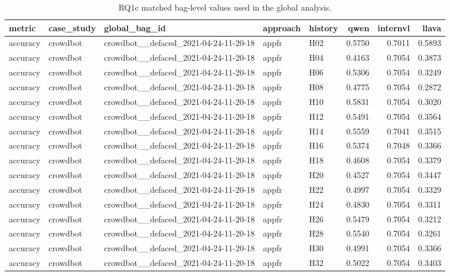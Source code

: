 \begin{table}[tbp]
\caption{RQ1c matched bag-level values used in the global analysis.}
\label{tab:rq1c_global_aligned_values}
\begin{tabular}{lllllrrr}
\toprule
metric & case\_study & global\_bag\_id & approach & history & qwen & internvl & llava \\
\midrule
accuracy & crowdbot & crowdbot\_\_defaced\_2021-04-24-11-20-18 & appfr & H02 & 0.5750 & 0.7011 & 0.5893 \\
accuracy & crowdbot & crowdbot\_\_defaced\_2021-04-24-11-20-18 & appfr & H04 & 0.4163 & 0.7054 & 0.3873 \\
accuracy & crowdbot & crowdbot\_\_defaced\_2021-04-24-11-20-18 & appfr & H06 & 0.5306 & 0.7054 & 0.3249 \\
accuracy & crowdbot & crowdbot\_\_defaced\_2021-04-24-11-20-18 & appfr & H08 & 0.4775 & 0.7054 & 0.2872 \\
accuracy & crowdbot & crowdbot\_\_defaced\_2021-04-24-11-20-18 & appfr & H10 & 0.5831 & 0.7054 & 0.3020 \\
accuracy & crowdbot & crowdbot\_\_defaced\_2021-04-24-11-20-18 & appfr & H12 & 0.5491 & 0.7054 & 0.3564 \\
accuracy & crowdbot & crowdbot\_\_defaced\_2021-04-24-11-20-18 & appfr & H14 & 0.5559 & 0.7041 & 0.3515 \\
accuracy & crowdbot & crowdbot\_\_defaced\_2021-04-24-11-20-18 & appfr & H16 & 0.5374 & 0.7048 & 0.3366 \\
accuracy & crowdbot & crowdbot\_\_defaced\_2021-04-24-11-20-18 & appfr & H18 & 0.4608 & 0.7054 & 0.3379 \\
accuracy & crowdbot & crowdbot\_\_defaced\_2021-04-24-11-20-18 & appfr & H20 & 0.4527 & 0.7054 & 0.3447 \\
accuracy & crowdbot & crowdbot\_\_defaced\_2021-04-24-11-20-18 & appfr & H22 & 0.4997 & 0.7054 & 0.3329 \\
accuracy & crowdbot & crowdbot\_\_defaced\_2021-04-24-11-20-18 & appfr & H24 & 0.4830 & 0.7054 & 0.3311 \\
accuracy & crowdbot & crowdbot\_\_defaced\_2021-04-24-11-20-18 & appfr & H26 & 0.5479 & 0.7054 & 0.3212 \\
accuracy & crowdbot & crowdbot\_\_defaced\_2021-04-24-11-20-18 & appfr & H28 & 0.5540 & 0.7054 & 0.3261 \\
accuracy & crowdbot & crowdbot\_\_defaced\_2021-04-24-11-20-18 & appfr & H30 & 0.4991 & 0.7054 & 0.3366 \\
accuracy & crowdbot & crowdbot\_\_defaced\_2021-04-24-11-20-18 & appfr & H32 & 0.5022 & 0.7054 & 0.3403 \\

\end{tabular}
\end{table}
